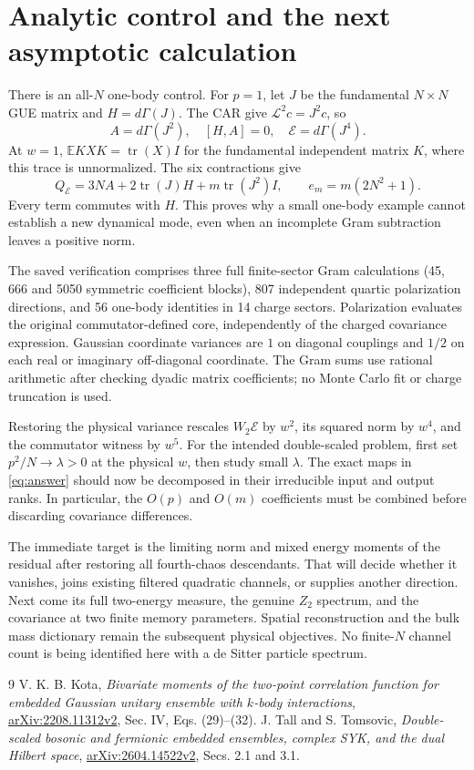 \documentclass[11pt,a4paper]{article}
\newcommand{\EE}{\mathbb E}
\newcommand{\core}{\mathcal E}
\DeclareMathOperator{\tr}{tr}
\begin{document}
\newpage
\section{Analytic control and the next asymptotic calculation}
There is an all-$N$ one-body control. For $p=1$, let $J$ be the
fundamental $N\times N$ GUE matrix and $H=d\Gamma(J)$. The CAR give
$\mathcal L^2c=J^2c$, so
\begin{equation}
 A=d\Gamma(J^2),\quad [H,A]=0,\quad \core=d\Gamma(J^4).
\end{equation}
At $w=1$, $\EE KXK=\tr(X)I$ for the fundamental independent
matrix $K$, where this trace is unnormalized. The six contractions give
\begin{equation}
 Q_{\core}=3NA+2\tr(J)H+m\tr(J^2)I,\qquad
 e_m=m(2N^2+1).
\end{equation}
Every term commutes with $H$. This proves why a small one-body
example cannot establish a new dynamical mode, even when an
incomplete Gram subtraction leaves a positive norm.

The saved verification comprises three full finite-sector Gram
calculations (45, 666 and 5050 symmetric coefficient blocks),
807 independent quartic polarization directions, and 56 one-body
identities in 14 charge sectors. Polarization evaluates the original
commutator-defined core, independently of the charged covariance
expression. Gaussian coordinate variances are $1$ on diagonal
couplings and $1/2$ on each real or imaginary off-diagonal coordinate.
The Gram sums use rational arithmetic after checking dyadic matrix
coefficients; no Monte Carlo fit or charge truncation is used.

Restoring the physical variance rescales $W_2\core$ by $w^2$,
its squared norm by $w^4$, and the commutator witness by $w^5$.
For the intended double-scaled problem, first set $p^2/N\to\lambda>0$
at the physical $w$, then study small $\lambda$. The exact maps in
\eqref{eq:answer} should now be decomposed in their irreducible
input and output ranks. In particular, the $O(p)$ and $O(m)$
coefficients must be combined before discarding covariance differences.

The immediate target is the limiting norm and mixed energy moments
of the residual after restoring all fourth-chaos descendants. That
will decide whether it vanishes, joins existing filtered quadratic
channels, or supplies another direction. Next come its full two-energy
measure, the genuine $Z_2$ spectrum, and the covariance at two finite
memory parameters. Spatial reconstruction and the bulk mass dictionary
remain the subsequent physical objectives. No finite-$N$ channel
count is being identified here with a de Sitter particle spectrum.

\begin{thebibliography}{9}
 V. K. B. Kota,
\emph{Bivariate moments of the two-point correlation function for embedded
Gaussian unitary ensemble with $k$-body interactions},
\href{https://arxiv.org/html/2208.11312}{arXiv:2208.11312v2},
Sec. IV, Eqs. (29)--(32).
 J. Tall and S. Tomsovic,
\emph{Double-scaled bosonic and fermionic embedded ensembles,
complex SYK, and the dual Hilbert space},
\href{https://arxiv.org/html/2604.14522v2}{arXiv:2604.14522v2},
Secs. 2.1 and 3.1.
\end{thebibliography}
\end{document}

